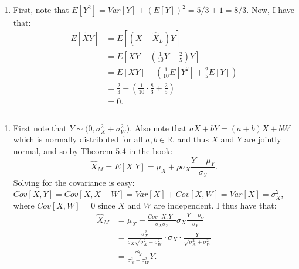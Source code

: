 \begin{problem}{6}
\begin{enumerate}
\item First, note that $E[Y^2] = Var[Y]+(E[Y])^2 = 5/3+1 = 8/3$.  Now, I have that:
\begin{align*}
E[\tilde X Y] & = E[(X-\hat X_L)Y] \\
& = E\left[XY - \left(\frac{1}{10}Y+\frac{2}{5} \right)Y \right] \\
& = E[XY] - \left( \frac{1}{10}E[Y^2] +\frac{2}{5}E[Y] \right) \\
& = \frac{2}{3}- \left( \frac{1}{10}\cdot \frac{8}{3} +\frac{2}{5} \right) \\
& = 0.
\end{align*}


\end{enumerate}
\end{problem}

\begin{problem}{7} $ $

\begin{enumerate}
\item  First note that $Y \sim \mathcal (0, \sigma_X^2+\sigma_W^2)$.  Also note that $aX+bY = (a+b)X+bW$ which is normally distributed for all $a, b \in \mathbb R$, and thus $X$ and $Y$ are jointly normal, and so by Theorem 5.4 in the book:
\begin{equation*}
\hat X_M = E[X|Y] = \mu_X+\rho \sigma_X \frac{Y-\mu_Y}{\sigma_Y}.
\end{equation*}
Solving for the covariance is easy: $Cov[X, Y] = Cov[X, X+W] = Var[X]+Cov[X, W]=Var[X]= \sigma_X^2$, where $Cov[X, W] = 0$ since $X$ and $W$ are independent.  I thus have that:
\begin{align*}
\hat X_M &= \mu_X+\frac{Cov[X, Y]}{\sigma_X \sigma_Y} \sigma_X \frac{Y-\mu_Y}{\sigma_Y} \\ 
&= \frac{\sigma_X^2}{\sigma_X \sqrt{\sigma_X^2+\sigma_W^2}}\cdot \sigma_X \cdot \frac{Y}{\sqrt{\sigma_X^2+\sigma_W^2}} \\
& = \frac{\sigma_X^2}{\sigma_X^2+\sigma_W^2}Y.
\end{align*}


\end{enumerate}
\end{problem}
